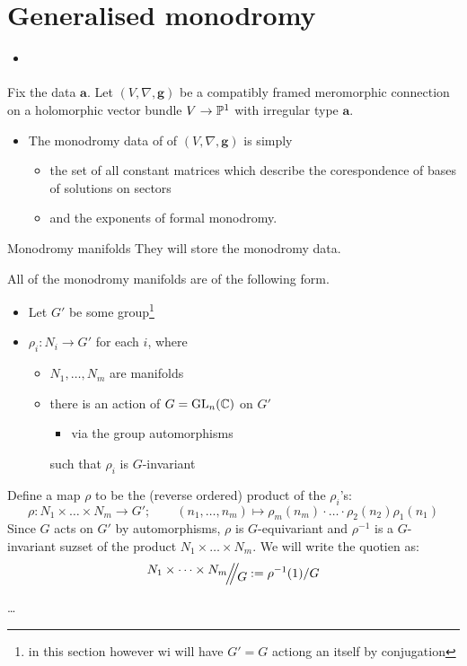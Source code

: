 \section{Generalised monodromy}%
\begin{frame}
  {\Huge\insertsection{}}
  \begin{itemize}
    \item \cite{boalch}
  \end{itemize}
  Fix the data $\textbf{a}$. Let $(V,\nabla,\textbf{g})$ be a compatibly framed
  meromorphic connection on a holomorphic vector bundle $V\to\P^1$ with
  irregular type $\textbf{a}$.

  \begin{itemize}
    \item The monodromy data of of $(V,\nabla,\textbf{g})$ is simply
      \begin{itemize}
        \item the set of all constant matrices which describe the corespondence
          of bases of solutions on sectors
        \item and the exponents of formal monodromy.
      \end{itemize}
  \end{itemize}
\end{frame}

\begin{frame}{Monodromy manifolds}
  They will store the monodromy data.

  All of the monodromy manifolds are of the following form.
  \begin{itemize}
    \item Let $G'$ be some group\footnote{in this section however wi will have
      $G'=G$ actiong an itself by conjugation}
    \item $\rho_i:N_i\to G'$ for each $i$, where
      \begin{itemize}
        \item $N_1,\dots,N_m$ are manifolds
        \item there is an action of $G=\GL_n(\C)$ on $G'$
          \begin{itemize}
            \item via the group automorphisms
          \end{itemize}
          such that $\rho_i$ is $G$-invariant

      \end{itemize}
  \end{itemize}
  Define a map $\rho$ to be the (reverse ordered) product of the $\rho_i$’s:
  \[
    \rho:N_1\times\dots\times N_m\to G'; \qquad (n_1,\dots,n_m)\mapsto
    \rho_m(n_m)\cdot\dots\cdot\rho_2(n_2)\rho_1(n_1)
  \]
  Since $G$ acts on $G'$ by automorphisms, $\rho$ is $G$-equivariant and
  $\rho^{-1}$ is a $G$-invariant suzset of the product
  $N_1\times\dots\times N_m$. We will write the quotien as:
  \[
    \symplquot{N_1\times\dots\times N_m}{G}:=\rho^{-1}(1)/G
  \]
  \begin{defn}[3.1]
    \dots
  \end{defn}
\end{frame}

